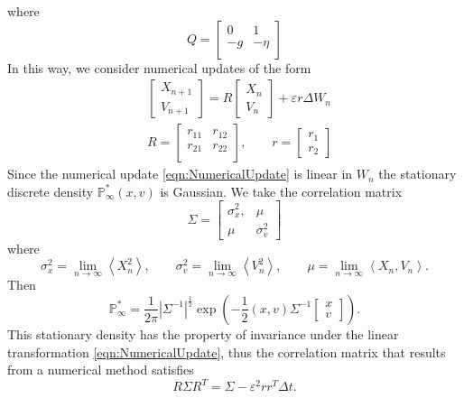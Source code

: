 	where
$$
	Q =
\begin{bmatrix}
	0	& 1	\\
	-g	& -\eta	\\
\end{bmatrix}
$$
In this way, we consider numerical updates of the form
\begin{align}\label{eqn:NumericalUpdate}
	&\begin{bmatrix}
		X_{n+1}\\ V_{n+1}
	\end{bmatrix}
	=
	R
	\begin{bmatrix}
		X_{n}\\ V_{n}
	\end{bmatrix}
	+ \varepsilon r \Delta W_n\\
	&R =
	\begin{bmatrix}
		r_{11}	& r_{12}\\
		r_{21}	& r_{22}\\
	\end{bmatrix},
	\qquad 
	r=
	\begin{bmatrix}
		r_1\\
		r_2
	\end{bmatrix}
\end{align}
Since the numerical update \eqref{eqn:NumericalUpdate} is linear in $W_n$ the stationary discrete density 
$\mathbb{P}_{\infty}^{*}(x,v)$ is Gaussian. We take the correlation matrix 
$$
	\Sigma=
	\begin{bmatrix}
		\sigma_x^2,	& \mu\\
		\mu			& \sigma_v^{2}
	\end{bmatrix}
$$
where
\begin{equation}
	\sigma_x^2 = \lim_{n \to \infty} \left\langle X_n^2\right\rangle, \qquad
	\sigma_v^2 = \lim_{n \to \infty} \left\langle V_n^2\right\rangle, \qquad
\mu = \lim_{n \to \infty} \left\langle X_n,V_n\right\rangle .
\end{equation}
Then
\begin{equation}
	\mathbb{P}_{\infty}^* = 
		\frac{1}{2\pi}
		\left|
			\Sigma^{-1}
		\right|^{\frac{1}{2}}
	\exp\left(
		-\frac{1}{2}(x,v)
		\Sigma^{-1}
		\begin{bmatrix}
			x\\v
		\end{bmatrix}
	\right).
\end{equation}
This stationary density has the property of invariance under the linear transformation 
\eqref{eqn:NumericalUpdate}, thus the correlation matrix that results from a numerical method 
satisfies
\begin{equation}
	R \Sigma R^T = \Sigma - \varepsilon^2 r r^T \Delta t.
\end{equation}
